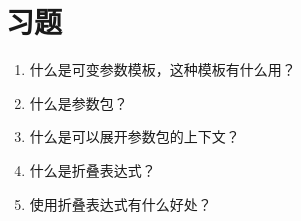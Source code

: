 \section{习题}
\begin{enumerate}
  \item 什么是可变参数模板，这种模板有什么用？
  \item 什么是参数包？
  \item 什么是可以展开参数包的上下文？
  \item 什么是折叠表达式？
  \item 使用折叠表达式有什么好处？
\end{enumerate}